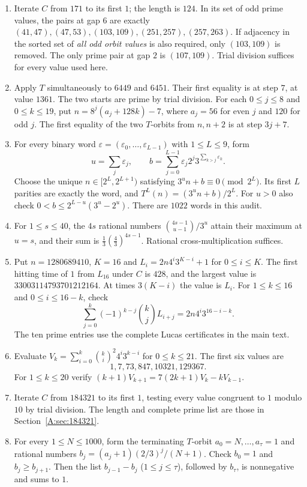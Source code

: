 \documentclass[11pt,a4paper]{article}
\theoremstyle{definition}
\theoremstyle{remark}
\numberwithin{equation}{section}
\begin{document}
\begin{enumerate}
\item Iterate $C$ from $171$ to its first $1$; the length is $124$.
In its set of odd prime values, the pairs at gap $6$ are exactly
$(41,47),(47,53),(103,109),(251,257),(257,263)$.
If adjacency in the sorted set of \emph{all odd orbit values} is also
required, only $(103,109)$ is removed. The only prime pair at gap $2$
is $(107,109)$. Trial division suffices for every value used here.
\item Apply $T$ simultaneously to $6449$ and $6451$. Their first equality
is at step $7$, at value $1361$. The two starts are prime by trial division.
For each $0\le j\le8$ and $0\le k\le19$, put
$n=8^j(a_j+128k)-7$, where $a_j=56$ for even $j$ and $120$ for odd $j$.
The first equality of the two $T$-orbits from $n,n+2$ is at step $3j+7$.
\item For every binary word $\varepsilon=(\varepsilon_0,\ldots,
\varepsilon_{L-1})$ with $1\le L\le9$, form
\[
 u=\sum_j\varepsilon_j,\qquad
 b=\sum_{j=0}^{L-1}\varepsilon_j2^j
       3^{\sum_{k>j}\varepsilon_k}.
\]
Choose the unique $n\in[2^L,2^{L+1})$ satisfying
$3^u n+b\equiv0\pmod{2^L}$. Its first $L$ parities are exactly the
word, and $T^L(n)=(3^u n+b)/2^L$. For $u>0$ also check
$0<b\le2^{L-u}(3^u-2^u)$. There are $1022$ words in this audit.
\item For $1\le s\le40$, the $4s$ rational numbers
$\binom{4s-1}{u-1}/3^u$ attain their maximum at $u=s$, and their sum is
$\frac13(\frac43)^{4s-1}$. Rational cross-multiplication suffices.
\item Put $n=1280689410$, $K=16$ and
$L_i=2n4^i3^{K-i}+1$ for $0\le i\le K$.
The first hitting time of $1$ from $L_{16}$ under $C$ is $428$, and the
largest value is $33003114793701212164$. At times $3(K-i)$ the value is
$L_i$. For $1\le k\le16$ and $0\le i\le16-k$, check
\[
 \sum_{j=0}^k(-1)^{k-j}\binom kj L_{i+j}
   =2n4^i3^{16-i-k}.
\]
The ten prime entries use the complete Lucas certificates in the main text.
\item Evaluate
$V_k=\sum_{i=0}^k\binom ki^2 4^i3^{k-i}$ for $0\le k\le21$.
The first six values are
\[1,7,73,847,10321,129367.\]
For
$1\le k\le20$ verify
$(k+1)V_{k+1}=7(2k+1)V_k-kV_{k-1}$.
\item Iterate $C$ from $184321$ to its first $1$, testing every value
congruent to $1$ modulo $10$ by trial division. The length and complete
prime list are those in Section~\ref{A:sec:184321}.
\item For every $1\le N\le1000$, form the terminating $T$-orbit
$a_0=N,\ldots,a_\tau=1$ and rational numbers
$b_j=(a_j+1)(2/3)^j/(N+1)$. Check $b_0=1$ and $b_j\ge b_{j+1}$.
Then the list $b_{j-1}-b_j$ ($1\le j\le\tau$), followed by $b_\tau$,
is nonnegative and sums to $1$.
\end{enumerate}
\end{document}
